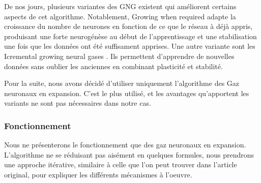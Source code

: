 	De nos jours, plusieurs variantes des GNG existent qui améliorent certains aspects de cet algorithme. Notablement, Growing when required \cite{marsland2002self} adapte la croissance du nombre de neurones en fonction de ce que le réseau à déjà appris, produisant une forte neurogénèse au début de l'apprentissage et une stabilisation une fois que les données ont été suffisament apprises. Une autre variante sont les Icremental growing neural gases \cite{prudent2005incremental}. Ils permettent d'apprendre de nouvelles données sans oublier les anciennes en combinant plasticité et stabilité.

	Pour la suite, nous avons décidé d'utiliser uniquement l'algorithme des Gaz neuronaux en expansion. C'est le plus utilisé, et les avantages qu'apportent les variants ne sont pas nécessaires dans notre cas.

	\subsubsection{Fonctionnement}

	Nous ne présenterons le fonctionnement que des gaz neuronaux en expansion. L'algorithme ne se réduisant pas aisément en quelques formules, nous prendrons une approche itérative, similaire à celle que l'on peut trouver dans l'article original, pour expliquer les différents mécanismes à l'oeuvre.\\

